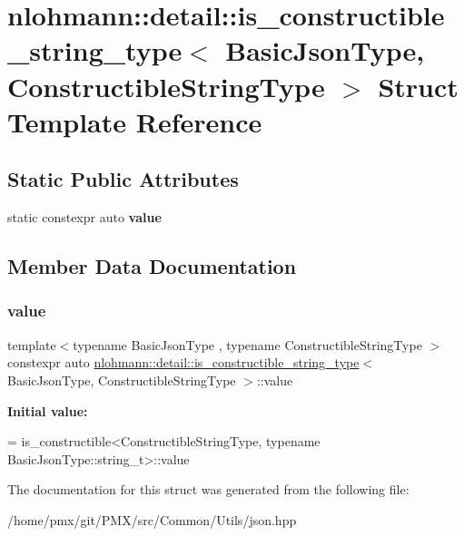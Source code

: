 \hypertarget{structnlohmann_1_1detail_1_1is__constructible__string__type}{}\section{nlohmann\+:\+:detail\+:\+:is\+\_\+constructible\+\_\+string\+\_\+type$<$ Basic\+Json\+Type, Constructible\+String\+Type $>$ Struct Template Reference}
\label{structnlohmann_1_1detail_1_1is__constructible__string__type}
\subsection*{Static Public Attributes}
\begin{DoxyCompactItemize}
\item 
static constexpr auto {\bfseries value}
\end{DoxyCompactItemize}


\subsection{Member Data Documentation}
\mbox{\label{structnlohmann_1_1detail_1_1is__constructible__string__type_a7006ba555b7a92e3f35f8806f781a995}} 
\subsubsection{\texorpdfstring{value}{value}}
{\footnotesize\ttfamily template$<$typename Basic\+Json\+Type , typename Constructible\+String\+Type $>$ \\
constexpr auto \hyperlink{structnlohmann_1_1detail_1_1is__constructible__string__type}{nlohmann\+::detail\+::is\+\_\+constructible\+\_\+string\+\_\+type}$<$ Basic\+Json\+Type, Constructible\+String\+Type $>$\+::value\hspace{0.3cm}{\ttfamily [static]}}

{\bfseries Initial value\+:}
\begin{DoxyCode}
=
        is\_constructible<ConstructibleStringType,
        \textcolor{keyword}{typename} BasicJsonType::string\_t>::value
\end{DoxyCode}


The documentation for this struct was generated from the following file\+:\begin{DoxyCompactItemize}
\item 
/home/pmx/git/\+P\+M\+X/src/\+Common/\+Utils/json.\+hpp\end{DoxyCompactItemize}
